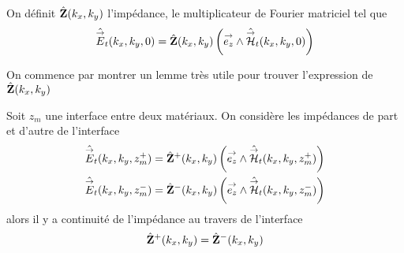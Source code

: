 
        \begin{defn}
            \label{def:plan:impedance}
            On définit \(\hat {\mathbf{Z}}(k_x,k_y)\) l'impédance, le multiplicateur de Fourier matriciel tel que
            \begin{equation*}
                \hat {{\overset{\rightarrow}{E}}}_t(k_x,k_y,0) = \hat {\mathbf{Z}}(k_x,k_y) \left({\overset{\rightarrow}{e_z}} \wedge \hat {{\overset{\rightarrow}{\mathcal{H}}}}_t(k_x,k_y,0)\right)
            \end{equation*}
        \end{defn}

        On commence par montrer un lemme très utile pour trouver l'expression de \(\hat {\mathbf{Z}}(k_x,k_y)\)
        \begin{lemme}
            \label{lem:plan:continuite_impedance}
            Soit \(z_m\) une interface entre deux matériaux. On considère les impédances de part et d'autre de l'interface
            \begin{align*}
                \hat{{\overset{\rightarrow}{E}}}_t(k_x,k_y,z_m^+) &= \hat{\mathbf{Z}}^+(k_x,k_y) \left({\overset{\rightarrow}{e_z}} \wedge \hat{{\overset{\rightarrow}{\mathcal{H}}}}_t(k_x,k_y,z_m^+)\right)
                \\
                \hat{{\overset{\rightarrow}{E}}}_t(k_x,k_y,z_m^-) &= \hat{\mathbf{Z}}^-(k_x,k_y) \left({\overset{\rightarrow}{e_z}} \wedge \hat{{\overset{\rightarrow}{\mathcal{H}}}}_t(k_x,k_y,z_m^-)\right)
            \end{align*}
            alors il y a continuité de l'impédance au travers de l'interface
            \begin{equation*}
            \hat {\mathbf{Z}}^+(k_x,k_y) = \hat {\mathbf{Z}}^-(k_x,k_y)
            \end{equation*}
        \end{lemme}
